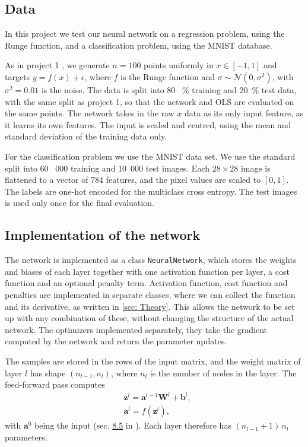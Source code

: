 \documentclass[reprint,english,notitlepage, floatfix]{revtex4-2}  %
\begin{document}
\subsection{Data}\label{sec:data}

In this project we test our neural network on a regression problem, using the Runge function, and a classification problem, using the MNIST database. 

As in project 1 \cite{p1}, we generate $n = 100$ points uniformly in $x \in [-1, 1]$ and targets $y = f(x) + \epsilon$, where $f$ is the Runge function and $\sigma \sim \mathcal{N}(0, \sigma^2)$, with $\sigma^2  = 0.01$ is the noise. The data is split into 80 \, \% training and 20\, \% test data, with the same split as project 1, so that the network and OLS are evaluated on the same points. The network takes in the raw $x$ data as its only input feature, as it learns its own features. The input is scaled and centred, using the mean and standard deviation of the training data only. 

For the classification problem we use the MNIST data set. We use the standard split into 60 \, 000 training and 10\, 000 test images. Each $28 \times 28$ image is flattened to a vector of 784 features, and the pixel values are scaled to $[0, 1]$. The labels are one-hot encoded for the multiclass cross entropy. The test images is used only once for the final evaluation. 


\subsection{Implementation of the network}\label{sec:implementation}

The network is implemented as a class \texttt{NeuralNetwork}, which stores the weights and biases of each layer together with one activation function per layer, a cost function and an optional penalty term. Activation function, cost function and penalties are implemented in separate classes, where we can collect the function and its derivative, as written in \autoref{sec: Theory}. This allows the network to be set up with any combination of these, without changing the structure of the actual network. The optimizers implemented separately, they take the gradient computed by the network and return the parameter updates. 

The samples are stored in the rows of the input matrix, and the weight matrix of layer $l$ has shape $(n_{l-1}, n_l)$, where $n_l$ is the number of nodes in the layer. The feed-forward pass computes
\begin{align*}
    & \boldsymbol{z}^l = \boldsymbol{a}^{l-1} \boldsymbol{W}^l + \boldsymbol{b}^l,\\
    & \boldsymbol{a}^l = f(\boldsymbol{z}^l),
\end{align*}
with $\boldsymbol{a}^0$ being the input (sec. \href{https://educationalmaterialuio.github.io/MachineLearningUiO/doc/LectureNotes/_build/html/chapter8.html#notation-and-the-feed-forward-pass}{8.5} in \cite{lecture_book}). Each layer therefore has $(n_{l-1} + 1) \, n_l$ parameters. 
\end{document}
